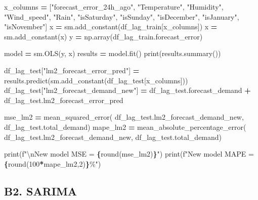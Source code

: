 \documentclass[mstat,12pt]{unswthesis}
\newenvironment{Shaded}{\begin{snugshade}}{\end{snugshade}}
\newcommand{\BuiltInTok}[1]{#1}
\newcommand{\CharTok}[1]{\textcolor[rgb]{0.31,0.60,0.02}{#1}}
\newcommand{\DecValTok}[1]{\textcolor[rgb]{0.00,0.00,0.81}{#1}}
\newcommand{\NormalTok}[1]{#1}
\newcommand{\OperatorTok}[1]{\textcolor[rgb]{0.81,0.36,0.00}{\textbf{#1}}}
\newcommand{\SpecialCharTok}[1]{\textcolor[rgb]{0.81,0.36,0.00}{\textbf{#1}}}
\newcommand{\SpecialStringTok}[1]{\textcolor[rgb]{0.31,0.60,0.02}{#1}}
\newcommand{\StringTok}[1]{\textcolor[rgb]{0.31,0.60,0.02}{#1}}
\begin{document}
\begin{Shaded}
\begin{Highlighting}[]
\NormalTok{x\_columns }\OperatorTok{=}\NormalTok{ [}\StringTok{"forecast\_error\_24h\_ago"}\NormalTok{, }\StringTok{"Temperature"}\NormalTok{, }\StringTok{"Humidity"}\NormalTok{, }
            \StringTok{"Wind\_speed"}\NormalTok{, }\StringTok{"Rain"}\NormalTok{, }\StringTok{"isSaturday"}\NormalTok{, }\StringTok{"isSunday"}\NormalTok{, }\StringTok{"isDecember"}\NormalTok{, }
            \StringTok{"isJanuary"}\NormalTok{, }\StringTok{"isNovember"}\NormalTok{]}
\NormalTok{x }\OperatorTok{=}\NormalTok{ sm.add\_constant(df\_lag\_train[x\_columns])}
\NormalTok{x }\OperatorTok{=}\NormalTok{ sm.add\_constant(x)}
\NormalTok{y }\OperatorTok{=}\NormalTok{ np.array(df\_lag\_train.forecast\_error)}

\NormalTok{model }\OperatorTok{=}\NormalTok{ sm.OLS(y, x)}
\NormalTok{results }\OperatorTok{=}\NormalTok{ model.fit()}
\BuiltInTok{print}\NormalTok{(results.summary())}

\NormalTok{df\_lag\_test[}\StringTok{"lm2\_forecast\_error\_pred"}\NormalTok{] }\OperatorTok{=} 
\NormalTok{    results.predict(sm.add\_constant(df\_lag\_test[x\_columns]))}
\NormalTok{df\_lag\_test[}\StringTok{"lm2\_forecast\_demand\_new"}\NormalTok{] }\OperatorTok{=}\NormalTok{ df\_lag\_test.forecast\_demand }\OperatorTok{+} 
\NormalTok{    df\_lag\_test.lm2\_forecast\_error\_pred}

\NormalTok{mse\_lm2 }\OperatorTok{=}\NormalTok{ mean\_squared\_error(}
\NormalTok{    df\_lag\_test.lm2\_forecast\_demand\_new, df\_lag\_test.total\_demand)}
\NormalTok{mape\_lm2 }\OperatorTok{=}\NormalTok{ mean\_absolute\_percentage\_error(}
\NormalTok{    df\_lag\_test.lm2\_forecast\_demand\_new, df\_lag\_test.total\_demand)}

\BuiltInTok{print}\NormalTok{(}\SpecialStringTok{f"}\CharTok{\textbackslash{}n}\SpecialStringTok{New model MSE = }\SpecialCharTok{\{}\BuiltInTok{round}\NormalTok{(mse\_lm2)}\SpecialCharTok{\}}\SpecialStringTok{"}\NormalTok{)}
\BuiltInTok{print}\NormalTok{(}\SpecialStringTok{f"New model MAPE = }\SpecialCharTok{\{}\BuiltInTok{round}\NormalTok{(}\DecValTok{100}\OperatorTok{*}\NormalTok{mape\_lm2,}\DecValTok{2}\NormalTok{)}\SpecialCharTok{\}}\SpecialStringTok{\%"}\NormalTok{)}
\end{Highlighting}
\end{Shaded}

\subsection*{B2. SARIMA}\label{b2.-sarima}
\end{document}
